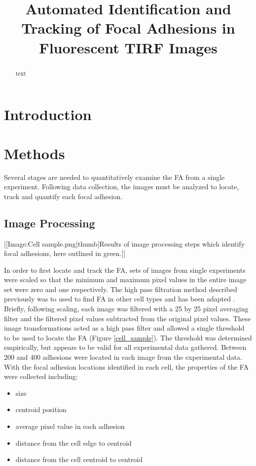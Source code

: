 \documentclass[letterpaper,twocolumn]{article}
\title{Automated Identification and Tracking of Focal Adhesions in Fluorescent TIRF Images}
\begin{document}
\maketitle

\begin{abstract}
text
\end{abstract}

\section*{Introduction}

\section*{Methods}

Several stages are needed to quantitatively examine the FA from a single experiment. Following data collection, the images must be analyzed to locate, track and quantify each focal adhesion.

\subsection*{Image Processing}

[[Image:Cell sample.png|thumb|Results of image processing steps which identify focal adhesions, here outlined in green.]]

In order to first locate and track the FA, sets of images from single experiments were scaled so that the minimum and maximum pixel values in the entire image set were zero and one respectively. The high pass filtration method described previously was to used to find FA in other cell types and has been adapted \cite{Zamir1999}. Briefly, following scaling, each image was filtered with a 25 by 25 pixel averaging filter and the filtered pixel values subtracted from the original pixel values. These image transformations acted as a high pass filter and allowed a single threshold to be used to locate the FA (Figure \ref{cell_sample}). The threshold was determined empirically, but appears to be valid for all experimental data gathered. Between 200 and 400 adhesions were located in each image from the experimental data. With the focal adhesion locations identified in each cell, the properties of the FA were collected including: 

\begin{itemize}
\item size
\item centroid position
\item average pixel value in each adhesion 
\item distance from the cell edge to centroid
\item distance from the cell centroid to centroid
\end{itemize}
\end{document}

